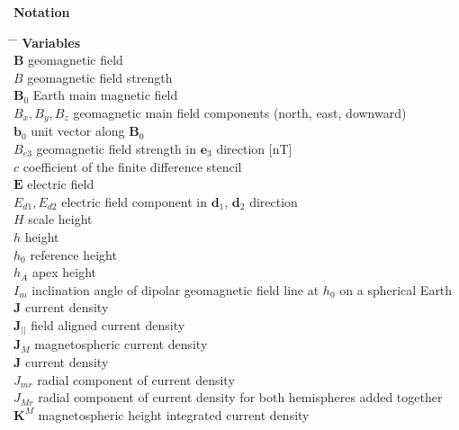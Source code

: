 %
\textbf{\Large{Notation}}
%
\begin{tabbing}
\hspace{5mm} \= \hspace{23mm} \=  \kill
%
\textbf{\Large{Variables}}                              \\

\>$\mathbf{B} $     \>  geomagnetic field  \\
\>$B$               \>  geomagnetic field strength   \\
\>$\mathbf{B}_0 $       \>  Earth main magnetic field  \\
\>$B_x, B_y, B_z$       \>  geomagnetic main field components (north, east, downward)  \\
\>$\mathbf{b}_0 $       \>  unit vector along $\mathbf{B}_0 $  \\
\>$B_{e3}$        	\>  geomagnetic field strength in $\mathbf{e}_3$ direction [nT]   \\
\>$c$        		\>  coefficient of the finite difference stencil   \\
\>$\mathbf E$        	\>  electric field   \\
\>$E_{d1}, E_{d2}$      \>  electric field component in $\mathbf{d}_1$,
                            $\mathbf{d}_2$ direction  \\
\>$H$        		\>  scale height    \\
\>$h$        		\>  height   \\
\>$h_0$        		\>  reference height   \\
\>$h_A$        		\>  apex height   \\
\>$I_m$        		\>  inclination angle of dipolar geomagnetic field line at $h_0$ on a spherical Earth  \\
\>$\mathbf J$        	\>  current density   \\
\>$\mathbf J_{||}$      \>  field aligned current density   \\
\>$\mathbf J_{M}$       \>  magnetospheric current density   \\
\>$\mathbf J$        	\>  current density   \\
\>$J_{mr}$        	\>  radial component of current density   \\
\>$J_{Mr}$        	\>  radial component of current density for both hemispheres added together  \\
\>$\mathbf K^{M}$       \>  magnetospheric height integrated current density   \\

\end{tabbing}
